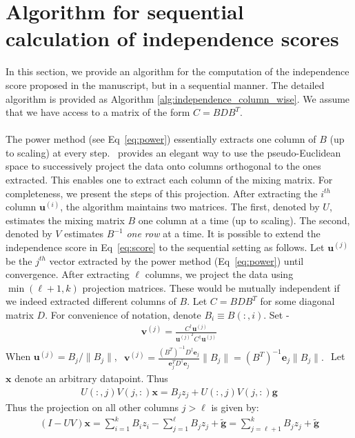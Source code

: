 \documentclass[letterpaper]{article}
\newcommand{\ba}[1]{\begin{align}#1\end{align}}
\newcommand{\bas}[1]{\begin{align*}#1\end{align*}}
\newcommand{\bu}{\pmb{u}}
\newcommand{\bx}{\pmb{x}}
\newcommand{\be}{\pmb{e}}
\newcommand{\bg}{\pmb{g}}
\newcommand{\bv}{\pmb{v}}
\begin{document}
\section{Algorithm for sequential calculation of independence scores}
\label{section:sequential_algorithm}
In this section, we provide an algorithm for the computation of the independence score proposed in the manuscript, but in a sequential manner. The detailed algorithm is provided as Algorithm \ref{alg:independence_column_wise}. We assume that we have access to a matrix of the form $C=BDB^T$. 
\\ \\
The power method (see Eq~\ref{eq:power}) essentially extracts one column of $B$ (up to scaling) at every step.~\cite{NIPS2015_89f03f7d} provides an elegant way to use the pseudo-Euclidean space to successively project the data onto columns orthogonal to the ones extracted. This enables one to extract each column of the mixing matrix. For completeness, we present the steps of this projection.
 After extracting the $i^{th}$ column $\bu^{(i)}$, the algorithm maintains two matrices. The first, denoted by $U$, estimates the mixing matrix $B$ one column at a time (up to scaling). The second, denoted by $V$ estimates $B^{-1}$ \textit{one row} at a time.
It is possible to extend the independence score in Eq~\ref{eq:score} to the sequential setting as follows. %
Let $\bu^{(j)}$ be the $j^{th}$ vector extracted by the power method (Eq~\ref{eq:power}) until convergence. 
After extracting $\ell$ columns, we project the data using $\min(\ell+1,k)$ projection matrices. These would be mutually independent if we indeed extracted different columns of $B$.  Let $C=BDB^T$ for some diagonal matrix $D$. For convenience of notation, denote $B_{i} \equiv B(:,i)$. Set -
\ba{\label{eq:projectionfirst}
\bv^{(j)}=\frac{C^{\dag}\bu^{(j)}}{{\bu^{(j)}}^T C^{\dag}\bu^{(j)}}
}
When $\bu^{(j)}=B_j/\|B_j\|$, 
$\begin{aligned}
\bv^{(j)}=\frac{(B^T)^{-1}D^{\dag}\be_j}{\be_j^TD^{\dag}\be_j}\|B_j\|=(B^T)^{-1}\be_j\|B_j\|.
\end{aligned}$
Let $\bx$ denote an arbitrary datapoint.
Thus 
\ba{\label{eq:proj}
U(:,j)V(j,:)\bx=B_jz_j+U(:,j)V(j,:)\bg
}
Thus the projection on all other columns $j>\ell$ is given by:
\bas{
(I-UV)\bx%
=\sum_{i=1}^k B_i z_i-\sum_{j=1}^\ell B_j z_j+ \tilde{\bg}=\sum_{j=\ell+1}^k B_j z_j+\tilde{\bg}
}
\end{document}
